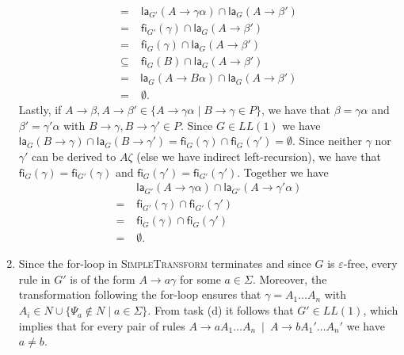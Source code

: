\begin{solution}
\begin{enumerate}
\begin{align*}
		=	&\; \textsf{la}_{G'}(A \rightarrow \gamma \alpha) \cap \textsf{la}_{G}(A \rightarrow \beta') \\
		=	&\; \textsf{fi}_{G'}(\gamma) \cap \textsf{la}_{G}(A \rightarrow \beta') \\
		=	&\; \textsf{fi}_{G}(\gamma) \cap  \textsf{la}_{G}(A \rightarrow \beta') \\
		\subseteq	&\; \textsf{fi}_{G}(B) \cap  \textsf{la}_{G}(A \rightarrow \beta') \\
		=	&\: \textsf{la}_{G}(A \rightarrow B \alpha) \cap  \textsf{la}_{G}(A \rightarrow \beta') \\
		= 	&\; \emptyset.
		\end{align*}
		Lastly, if $A \rightarrow \beta, A \rightarrow \beta' \in \{ A \rightarrow \gamma \alpha \mid B \rightarrow \gamma \in P \}$, we have that $\beta = \gamma \alpha$ and $\beta' = \gamma' \alpha$ with $B \rightarrow \gamma, B \rightarrow \gamma' \in P$. Since $G \in LL(1)$ we have $\textsf{la}_{G}(B \rightarrow \gamma ) \cap \textsf{la}_{G}(B \rightarrow \gamma') = \textsf{fi}_G(\gamma) \cap \textsf{fi}_G(\gamma') = \emptyset$. Since neither $\gamma$ nor $\gamma'$ can be derived to $A\zeta$ (else we have indirect left-recursion), we have that $\textsf{fi}_G(\gamma) = \textsf{fi}_{G'}(\gamma)$ and $\textsf{fi}_G(\gamma') = \textsf{fi}_{G'}(\gamma')$. Together we have 
		\begin{align*}
			&\; \textsf{la}_{G'}(A \rightarrow \gamma \alpha) \cap \textsf{la}_{G'}(A \rightarrow \gamma' \alpha) \\
		=   &\; \textsf{fi}_{G'}(\gamma) \cap \textsf{fi}_{G'}(\gamma') \\ 
		=   &\; \textsf{fi}_{G}(\gamma) \cap \textsf{fi}_{G}(\gamma') \\
		=	&\; \emptyset.
		\end{align*}
		\item Since the for-loop in \textsc{SimpleTransform} terminates and since $G$ is $\varepsilon$-free, every rule in $G'$ is of the form $A \rightarrow a\gamma$ for some $a \in \Sigma$. Moreover, the transformation following the for-loop ensures that $\gamma = A_1\ldots A_n$ with $A_i \in N \cup \{ \Psi_a \not\in N \mid a \in \Sigma \}$. From task (d) it follows that $G' \in LL(1)$, which implies that for every pair of rules $A \rightarrow a A_1 \dots A_n ~\mid~A \rightarrow b A_1' \dots A_n'$ we have $a \neq b$.
	\end{enumerate}
\end{solution}

